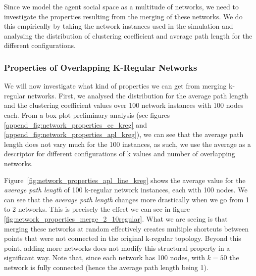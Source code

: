 \documentclass[preprint,number]{elsarticle}
\begin{document}
Since we model the agent social space as a multitude of networks, we need to investigate the properties resulting from the merging of these networks. We do this empirically by taking the network instances used in the simulation and analysing the distribution of clustering coefficient and average path length for the different configurations.

\subsubsection{Properties of Overlapping K-Regular Networks}
\label{sec:overlapping_kreg}
\noindent We will now investigate what kind of properties we can get from merging k-regular networks. First, we analysed the distribution for the average path length and the clustering coefficient values over 100 network instances with 100 nodes each. From a box plot preliminary analysis (see figures \ref{append_fig:network_properties_cc_kreg} and \ref{append_fig:network_properties_apl_kreg}), we can see that the average path length does not vary much for the 100 instances, as such, we use the average as a descriptor for different configurations of k values and number of overlapping networks. 

Figure~\ref{fig:network_properties_apl_line_kreg} shows the average value for the \textit{average path length} of 100 k-regular network instances, each with 100 nodes. We can see that the \textit{average path length} changes more drastically when we go from 1 to 2 networks. This is precisely the effect we can see in figure \ref{fig:network_properties_merge_2_10regular}. What we are seeing is that merging these networks at random effectively creates multiple shortcuts between points that were not connected in the original k-regular topology. Beyond this point, adding more networks does not modify this structural property in a significant way. Note that, since each network has 100 nodes, with $k=50$ the network is fully connected (hence the average path length being 1). 
\end{document}
